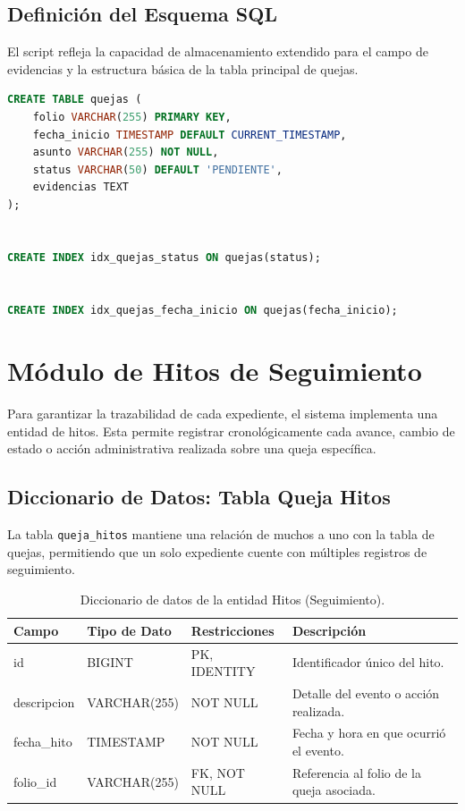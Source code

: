 \subsection{Definici\'on del Esquema SQL}
El script refleja la capacidad de almacenamiento extendido para el campo de evidencias y la estructura b\'asica de la tabla principal de quejas.

\begin{lstlisting}[language=SQL, caption={Script de creaci\'on para la tabla de quejas.}, label={lst:sql_quejas}]
CREATE TABLE quejas (
    folio VARCHAR(255) PRIMARY KEY,
    fecha_inicio TIMESTAMP DEFAULT CURRENT_TIMESTAMP,
    asunto VARCHAR(255) NOT NULL,
    status VARCHAR(50) DEFAULT 'PENDIENTE',
    evidencias TEXT
);


CREATE INDEX idx_quejas_status ON quejas(status);


CREATE INDEX idx_quejas_fecha_inicio ON quejas(fecha_inicio);
\end{lstlisting}


\section{M\'odulo de Hitos de Seguimiento}
Para garantizar la trazabilidad de cada expediente, el sistema implementa una entidad de hitos. Esta permite registrar cronol\'ogicamente cada avance, cambio de estado o acci\'on administrativa realizada sobre una queja espec\'ifica.

\subsection{Diccionario de Datos: Tabla Queja Hitos}
La tabla \texttt{queja\_hitos} mantiene una relaci\'on de muchos a uno con la tabla de quejas, permitiendo que un solo expediente cuente con m\'ultiples registros de seguimiento.

\begin{table}[H]
\centering
\small
\begin{tabularx}{\textwidth}{|l|l|l|X|}
\hline
\rowcolor{azulESCOM} 
\color{white}\textbf{Campo} & \color{white}\textbf{Tipo de Dato} & \color{white}\textbf{Restricciones} & \color{white}\textbf{Descripci\'on} \\ \hline
id & BIGINT & PK, IDENTITY & Identificador \'unico del hito. \\ \hline
descripcion & VARCHAR(255) & NOT NULL & Detalle del evento o acci\'on realizada. \\ \hline
fecha\_hito & TIMESTAMP & NOT NULL & Fecha y hora en que ocurri\'o el evento. \\ \hline
folio\_id & VARCHAR(255) & FK, NOT NULL & Referencia al folio de la queja asociada. \\ \hline
\end{tabularx}
\caption{Diccionario de datos de la entidad Hitos (Seguimiento).}
\label{tab:dict_hitos}
\end{table}

